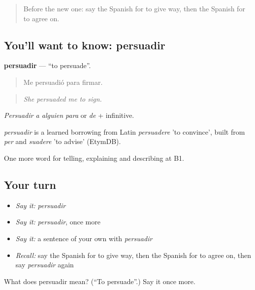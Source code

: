 \label{lesson:ES-C634-persuadir}



\begin{quote}
Before the new one: say the Spanish for to give way, then the Spanish for to agree on.
\end{quote}

\subsection*{You'll want to know: persuadir}
\textbf{persuadir} — \textquotedblleft{}to persuade\textquotedblright{}.

\begin{quote}
Me persuadió para firmar.
\end{quote}

\begin{quote}
\emph{She persuaded me to sign.}
\end{quote}

\emph{Persuadir a alguien para} or \emph{de} + infinitive.

\begin{cousinweb}
\emph{persuadir} is a learned borrowing from Latin \emph{persuadere} 'to convince', built from \emph{per} and \emph{suadere} 'to advise' (EtymDB).
\end{cousinweb}

\begin{grammarlens}[title={What you've built}]
One more word for telling, explaining and describing at B1.
\end{grammarlens}

\subsection*{Your turn}
\begin{itemize}
\raggedright
  \item \emph{Say it:} \emph{persuadir}
  \item \emph{Say it:} \emph{persuadir}, once more
  \item \emph{Say it:} a sentence of your own with \emph{persuadir}
  \item \emph{Recall:} say the Spanish for to give way, then the Spanish for to agree on, then say \emph{persuadir} again
\end{itemize}

\begin{tcolorbox}[breakable,colback=teal!4,colframe=teal!35!black,title={Before you move on}]
What does persuadir mean? (\textquotedblleft{}To persuade\textquotedblright{}.) Say it once more.
\end{tcolorbox}
